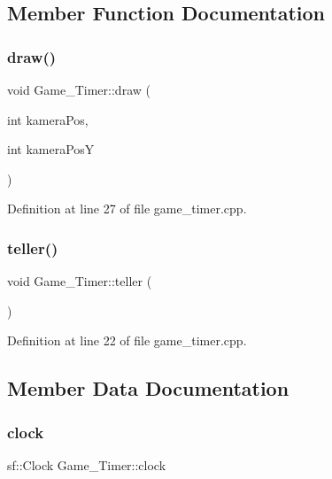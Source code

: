 \subsection{Member Function Documentation}
\hypertarget{class_game___timer_aec7c78ad66d424bce367c3016fb98232}{}\label{class_game___timer_aec7c78ad66d424bce367c3016fb98232} 
\subsubsection{\texorpdfstring{draw()}{draw()}}
{\footnotesize\ttfamily void Game\+\_\+\+Timer\+::draw (\begin{DoxyParamCaption}\item[{int}]{kamera\+Pos,  }\item[{int}]{kamera\+PosY }\end{DoxyParamCaption})}



Definition at line 27 of file game\+\_\+timer.\+cpp.

\hypertarget{class_game___timer_ab31ec234c05a3556d7f13cb2321b4bc4}{}\label{class_game___timer_ab31ec234c05a3556d7f13cb2321b4bc4} 
\subsubsection{\texorpdfstring{teller()}{teller()}}
{\footnotesize\ttfamily void Game\+\_\+\+Timer\+::teller (\begin{DoxyParamCaption}{ }\end{DoxyParamCaption})}



Definition at line 22 of file game\+\_\+timer.\+cpp.



\subsection{Member Data Documentation}
\hypertarget{class_game___timer_a0d0bd639a7113080aa7c6ba6d712ec38}{}\label{class_game___timer_a0d0bd639a7113080aa7c6ba6d712ec38} 
\subsubsection{\texorpdfstring{clock}{clock}}
{\footnotesize\ttfamily sf\+::\+Clock Game\+\_\+\+Timer\+::clock\hspace{0.3cm}{\ttfamily [protected]}}



